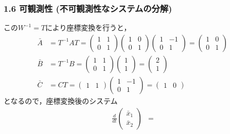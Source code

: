 \begin{frame}[t]
\frametitle{1.6 可観測性 (不可観測性なシステムの分解)}
この$W^{-1} = T$により座標変換を行うと，
\begin{align}
 \bar{A} &= T^{-1}AT =
 \left(
 \begin{array}{cc}
  1 & 1 \\
  0 & 1
 \end{array}
 \right)
 \left(
 \begin{array}{cc}
  1 & 0 \\
  0 & 1
 \end{array}
 \right)
 \left(
 \begin{array}{cc}
  1 & -1 \\
  0 & 1
 \end{array}
 \right) =
 \left(
 \begin{array}{cc}
  1 & 0 \\
  0 & 1
 \end{array}
 \right) \\
 \bar{B} &= T^{-1}B =
 \left(
 \begin{array}{cc}
  1 & 1 \\
  0 & 1
 \end{array}
 \right)
 \left(
 \begin{array}{c}
  1 \\
  1
 \end{array}
 \right) =
 \left(
 \begin{array}{c}
  2 \\
  1
 \end{array}
 \right) \\
 \bar{C} &= CT =
 \left(
 \begin{array}{cc}
  1 & 1
 \end{array}
 \right)
 \left(
 \begin{array}{cc}
  1 & -1 \\
  0 & 1
 \end{array}
 \right) =
 \left(
 \begin{array}{cc}
  1 & 0
 \end{array}
 \right)
\end{align}
となるので，座標変換後のシステム
\begin{align}
 \frac{d}{dt}
  \left(
   \begin{array}{c}
    \bar{x}_1 \\
    \bar{x}_2
   \end{array}
  \right) &=

\end{align}
\end{frame}
